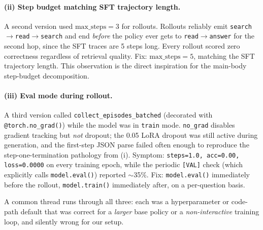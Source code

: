 \documentclass[11pt]{article}
\begin{document}
\paragraph{(ii) Step budget matching SFT trajectory length.}
A second version used $\mathrm{max\_steps}{=}3$ for rollouts.
Rollouts reliably emit
\texttt{search}$\to$\texttt{read}$\to$\texttt{search} and end
\emph{before} the policy ever gets to \texttt{read}$\to$\texttt{answer}
for the second hop, since the SFT traces are 5 steps long. Every
rollout scored zero correctness regardless of retrieval quality.
Fix: $\mathrm{max\_steps}{=}5$, matching the SFT trajectory length.
This observation is the direct inspiration for the main-body
step-budget decomposition.

\paragraph{(iii) Eval mode during rollout.}
A third version called \texttt{collect\_episodes\_batched}
(decorated with \texttt{@torch.no\_grad()}) while the model was
in \texttt{train} mode. \texttt{no\_grad} disables gradient
tracking but \emph{not} dropout; the 0.05 LoRA dropout was still
active during generation, and the first-step JSON parse failed
often enough to reproduce the step-one-termination pathology from
(i). Symptom: \texttt{steps=1.0, acc=0.00, loss=0.0000} on every
training epoch, while the periodic \texttt{[VAL]} check (which
explicitly calls \texttt{model.eval()}) reported $\sim$35\%.
Fix: \texttt{model.eval()} immediately before the rollout,
\texttt{model.train()} immediately after, on a per-question
basis.

A common thread runs through all three: each was a hyperparameter
or code-path default that was correct for a \emph{larger} base
policy or a \emph{non-interactive} training loop, and silently
wrong for our setup.
\end{document}
